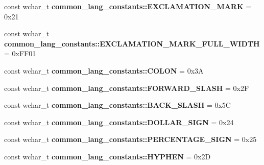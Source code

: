 \begin{DoxyCompactItemize}
\item 
\hypertarget{group___indexing_gae55eb18af6a8f78abf321431903ae574}{const wchar\-\_\-t {\bfseries common\-\_\-lang\-\_\-constants\-::\-E\-X\-C\-L\-A\-M\-A\-T\-I\-O\-N\-\_\-\-M\-A\-R\-K} = 0x21}\label{group___indexing_gae55eb18af6a8f78abf321431903ae574}

\item 
\hypertarget{group___indexing_gabf0e98ffc1048ff4bee9600eb6a232d7}{const wchar\-\_\-t {\bfseries common\-\_\-lang\-\_\-constants\-::\-E\-X\-C\-L\-A\-M\-A\-T\-I\-O\-N\-\_\-\-M\-A\-R\-K\-\_\-\-F\-U\-L\-L\-\_\-\-W\-I\-D\-T\-H} = 0x\-F\-F01}\label{group___indexing_gabf0e98ffc1048ff4bee9600eb6a232d7}

\item 
\hypertarget{group___indexing_ga41ddc1b590bfe8f7ac7390447509b528}{const wchar\-\_\-t {\bfseries common\-\_\-lang\-\_\-constants\-::\-C\-O\-L\-O\-N} = 0x3\-A}\label{group___indexing_ga41ddc1b590bfe8f7ac7390447509b528}

\item 
\hypertarget{group___indexing_ga6c8d70683ada1d2768778325956ae6a3}{const wchar\-\_\-t {\bfseries common\-\_\-lang\-\_\-constants\-::\-F\-O\-R\-W\-A\-R\-D\-\_\-\-S\-L\-A\-S\-H} = 0x2\-F}\label{group___indexing_ga6c8d70683ada1d2768778325956ae6a3}

\item 
\hypertarget{group___indexing_gabeec19e649a1b37059d977cb86000d60}{const wchar\-\_\-t {\bfseries common\-\_\-lang\-\_\-constants\-::\-B\-A\-C\-K\-\_\-\-S\-L\-A\-S\-H} = 0x5\-C}\label{group___indexing_gabeec19e649a1b37059d977cb86000d60}

\item 
\hypertarget{group___indexing_ga5bb0ec7c23078477e1de6b34eb5004c7}{const wchar\-\_\-t {\bfseries common\-\_\-lang\-\_\-constants\-::\-D\-O\-L\-L\-A\-R\-\_\-\-S\-I\-G\-N} = 0x24}\label{group___indexing_ga5bb0ec7c23078477e1de6b34eb5004c7}

\item 
\hypertarget{group___indexing_gaad197198a2844c42f4dc9503a1c65514}{const wchar\-\_\-t {\bfseries common\-\_\-lang\-\_\-constants\-::\-P\-E\-R\-C\-E\-N\-T\-A\-G\-E\-\_\-\-S\-I\-G\-N} = 0x25}\label{group___indexing_gaad197198a2844c42f4dc9503a1c65514}

\item 
\hypertarget{group___indexing_ga5198f496dc83445c18e668682f447a13}{const wchar\-\_\-t {\bfseries common\-\_\-lang\-\_\-constants\-::\-H\-Y\-P\-H\-E\-N} = 0x2\-D}\label{group___indexing_ga5198f496dc83445c18e668682f447a13}


\end{DoxyCompactItemize}
